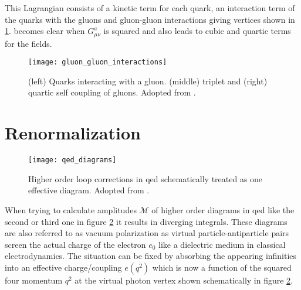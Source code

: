 This Lagrangian consists of a kinetic term for each quark, an interaction term of the quarks with the gluons and gluon-gluon interactions giving vertices shown in \ref{fig:qcd_vertices}. becomes clear when $G^a_{\mu\nu}$ is squared and also leads to cubic and quartic terms for the fields.
\begin{figure}[H]
    \centering
    \texttt{[image: gluon\_gluon\_interactions]}
    \caption[]{(left) Quarks interacting with a gluon. (middle) triplet and (right) quartic self coupling of gluons. Adopted from \citep{thomson2013modern}.}
    \label{fig:qcd_vertices}
\end{figure}

\section{Renormalization}\label{sec:renormalization}
\begin{figure}
    \centering
    \texttt{[image: qed\_diagrams]}
    \caption[]{Higher order loop corrections in \ac{qed} schematically treated as one effective diagram. Adopted from \citep{thomson2013modern}.}
    \label{fig:qed_diagrams}
\end{figure}
When trying to calculate amplitudes $\mathcal{M}$ of higher order diagrams in \ac{qed} like the second or third one in figure \ref{fig:qed_diagrams} it results in diverging integrals. These diagrams are also referred to as vacuum polarization as virtual particle-antiparticle pairs screen the actual charge of the electron $e_0$ like a dielectric medium in classical electrodynamics. The situation can be fixed by absorbing the appearing infinities into an effective charge/coupling $e(q^2)$ which is now a function of the squared four momentum $q^2$ at the virtual photon vertex shown schematically in figure \ref{fig:qed_diagrams}.

